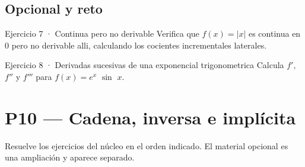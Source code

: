 \documentclass[10pt,a4paper,oneside,openany]{book}
\begin{document}
\section*{Opcional y reto}
\begin{PSevenOptionalFixed}{Ejercicio 7 · Continua pero no derivable}
Verifica que \(f(x)=|x|\) es continua en \(0\) pero no derivable alli, calculando los cocientes incrementales laterales.
\end{PSevenOptionalFixed}
\begin{PSevenOptionalFixed}{Ejercicio 8 · Derivadas sucesivas de una exponencial trigonometrica}
Calcula \(f',\) \(f''\) y \(f'''\) para \(f(x)=e^x\) \(\sin\) \(x\).
\end{PSevenOptionalFixed}
\chapter{P10 — Cadena, inversa e implícita}
Resuelve los ejercicios del núcleo en el orden indicado. El material opcional es una ampliación y aparece separado.
\end{document}
